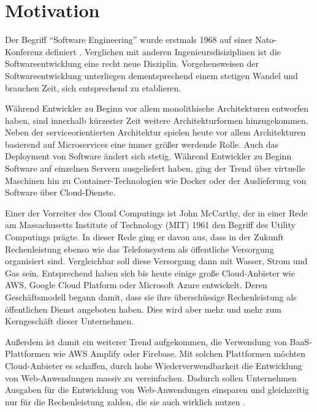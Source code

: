 \section{Motivation}

Der Begriff "`Software Engineering"' wurde erstmals 1968 auf einer Nato-Konferenz definiert \autocite{naur1969software}. Verglichen mit anderen Ingenieursdisiziplinen ist die Softwareentwicklung eine recht neue Disziplin. Vorgehensweisen der Softwareentwicklung unterliegen dementsprechend einem stetigen Wandel und brauchen Zeit, sich entsprechend zu etablieren.

Während Entwickler zu Beginn vor allem monolithische Architekturen entworfen haben, sind innerhalb kürzester Zeit weitere Architekturformen hinzugekommen. Neben der serviceorientierten Architektur spielen heute vor allem Architekturen basierend auf Microservices eine immer größer werdende Rolle. Auch das Deployment von Software ändert sich stetig. Während Entwickler zu Beginn Software auf einzelnen Servern ausgeliefert haben, ging der Trend über virtuelle Maschinen hin zu Container-Technologien wie Docker oder der Auslieferung von Software über Cloud-Dienste.

Einer der Vorreiter des Cloud Computings ist John McCarthy, der in einer Rede am Massachusetts Institute of Technology (MIT) 1961 den Begriff des Utility Computings prägte. In dieser Rede ging er davon aus, dass in der Zukunft Rechenleistung ebenso wie das Telefonsystem als öffentliche Versorgung organisiert sind. Vergleichbar soll diese Versorgung dann mit Wasser, Strom und Gas sein. Entsprechend haben sich bis heute einige große Cloud-Anbieter wie \ac{AWS}, Google Cloud Platform oder Microsoft Azure entwickelt. Deren Geschäftsmodell begann damit, dass sie ihre überschüssige Rechenleistung als öffentlichen Dienst angeboten haben. Dies wird aber mehr und mehr zum Kerngeschäft dieser Unternehmen. \autocite{buyya2013mastering}

Außerdem ist damit ein weiterer Trend aufgekommen, die Verwendung von \ac{BaaS}-Plattformen wie \ac{AWS} Amplify oder Firebase. Mit solchen Plattformen möchten Cloud-Anbieter es schaffen, durch hohe Wiederverwendbarkeit die Entwicklung von Web-Anwendungen massiv zu vereinfachen. Dadurch sollen Unternehmen Ausgaben für die Entwicklung von Web-Anwendungen einsparen und gleichzeitig nur für die Rechenleistung zahlen, die sie auch wirklich nutzen \autocite{villamizar2017cost}.